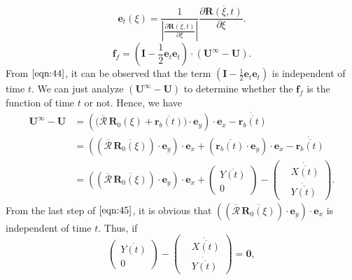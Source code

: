 \documentclass[a4paper,12pt]{report}
\begin{document}
\begin{equation}
	\label{eqn:43}
	\textbf{e}_t(\xi)=\frac{1}{|\frac{\partial\overline{\textbf{R}(\xi,t)}}{\partial\xi}|}\frac{\partial\overline{\textbf{R}(\xi,t)}}{\partial\xi}.
\end{equation}
\begin{equation}
	\label{eqn:44}
	\textbf{f}_{f}=\left(\mathbf{I}-\frac{1}{2}\textbf{e}_t\textbf{e}_t\right)\cdot(\textbf{U}^{\infty}-\textbf{U}).
\end{equation}
From $\eqref{eqn:44}$, it can be observed that the term $\left(\mathbf{I}-\frac{1}{2}\textbf{e}_t\textbf{e}_t\right)$ is independent of time $t$. We can just analyze $(\textbf{U}^{\infty}-\textbf{U})$ to determine whether the $\textbf{f}_{f}$ is the function of time $t$ or not. Hence, we have 
\begin{equation}
	\label{eqn:45}
	\begin{aligned}
		\textbf{U}^{\infty}-\textbf{U}&=\left(\Big(\overline{\bm{\mathcal{R}}}\,\textbf{R}_0(\xi)+\overline{\textbf{r}_b(t)}\Big)\cdot\textbf{e}_y\right)\cdot\textbf{e}_x-\dot{\overline{\textbf{r}_b(t)}}\\
		&=\left((\overline{\bm{\mathcal{R}}}\,\overline{\textbf{R}_0(\xi)})\cdot\textbf{e}_y\right)\cdot\textbf{e}_x+(\overline{\textbf{r}_b(t)}\cdot\textbf{e}_y)\cdot\textbf{e}_x-\dot{\overline{\textbf{r}_b(t)}}\\
		&=\left((\overline{\bm{\mathcal{R}}}\,\overline{\textbf{R}_0(\xi)})\cdot\textbf{e}_y\right)\cdot\textbf{e}_x+\left(\begin{aligned}
			\overline{Y(t)}\\
			0
		\end{aligned}\right)-\left(\begin{aligned}
			&\dot{\overline{X(t)}} \\
			&\dot{\overline{Y(t)}}
		\end{aligned}\right).
	\end{aligned}
\end{equation}
From the last step of $\eqref{eqn:45}$, it is obvious that $\left((\overline{\bm{\mathcal{R}}}\,\overline{\textbf{R}_0(\xi)})\cdot\textbf{e}_y\right)\cdot\textbf{e}_x$ is independent of time $t$. Thus, if 
\begin{equation}
	\label{eqn:46}
	\left(\begin{aligned}
		\overline{Y(t)}\\
		0
	\end{aligned}\right)-\left(\begin{aligned}
		&\dot{\overline{X(t)}} \\
	    &\dot{\overline{Y(t)}}
	\end{aligned}\right)=\textbf{0},
\end{equation}
\end{document}

